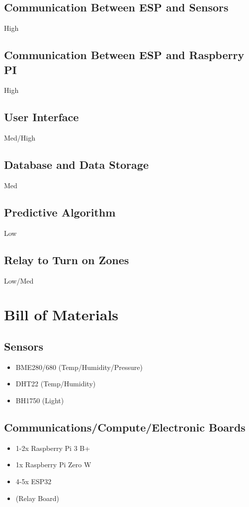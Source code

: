 \documentclass[letterpaper, 10 pt, conference]{ieeeconf}  %
\begin{document}
\subsection{Communication Between ESP and Sensors}
High

\subsection{Communication Between ESP and Raspberry PI}
High

\subsection{User Interface}
Med/High

\subsection{Database and Data Storage}
Med

\subsection{Predictive Algorithm}
Low

\subsection{Relay to Turn on Zones}
Low/Med

\section{Bill of Materials}
\subsection{Sensors}
\begin{itemize}
  \item BME280/680 (Temp/Humidity/Pressure)
  \item DHT22 (Temp/Humidity)
  \item BH1750 (Light)
\end{itemize}

\subsection{Communications/Compute/Electronic Boards}
\begin{itemize}
  \item 1-2x Raspberry Pi 3 B+
  \item 1x Raspberry Pi Zero W
  \item 4-5x ESP32
  \item (Relay Board)
\end{itemize}
\end{document}
